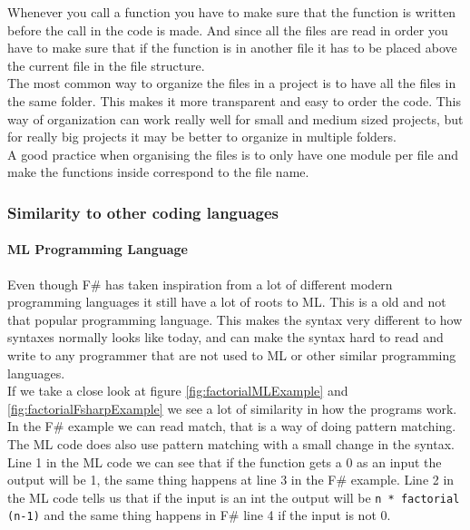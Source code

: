 \documentclass[12pt, a4paper]{article}
\newcommand{\code}[1]{{\small \texttt{#1}}}
\begin{document}
Whenever you call a function you have to make sure that the function is written before the call in the code is made. And since all the files are read in order you have to make sure that if the function is in another file it has to be placed above the current file in the file structure.\\

The most common way to organize the files in a project is to have all the files in the same folder. This makes it more transparent and easy to order the code. This way of organization can work really well for small and medium sized projects, but for really big projects it may be better to organize in multiple folders.\\

A good practice when organising the files is to only have one module per file and make the functions inside correspond to the file name.\\

\newpage
\subsubsection{Similarity to other coding languages}

\paragraph{ML Programming Language}

Even though F\# has taken inspiration from a lot of different modern programming languages it still have a lot of roots to ML. This is a old and not that popular programming language. This makes the syntax very different to how syntaxes normally looks like today, and can make the syntax hard to read and write to any programmer that are not used to ML or other similar programming languages.\\

If we take a close look at figure \ref{fig:factorialMLExample} and \ref{fig:factorialFsharpExample} we see a lot of similarity in how the programs work. In the F\# example we can read match, that is a way of doing pattern matching. The ML code does also use pattern matching with a small change in the syntax. Line 1 in the ML code we can see that if the function gets a 0 as an input the output will be 1, the same thing happens at line 3 in the F\# example. Line 2 in the ML code tells us that if the input is an int the output will be \code{n * factorial (n-1)} and the same thing happens in F\# line 4 if the input is not 0.\\
\end{document}
